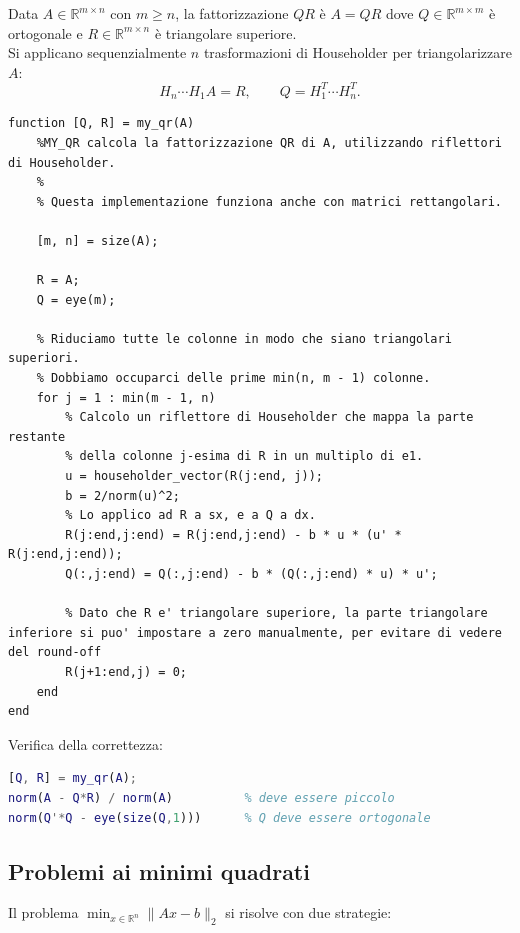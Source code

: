 \documentclass[12pt,a4paper,]{report}
\begin{document}
Data $A \in \mathbb{R}^{m \times n}$ con $m \geq n$, la fattorizzazione $QR$ è
$A = QR$ dove $Q \in \mathbb{R}^{m \times m}$ è ortogonale e $R \in \mathbb{R}^{m \times n}$
è triangolare superiore.\\
Si applicano sequenzialmente $n$ trasformazioni di Householder per triangolarizzare $A$:
\[
  H_n \cdots H_1 A = R, \qquad Q = H_1^T \cdots H_n^T.
\]
\begin{lstlisting}
function [Q, R] = my_qr(A)
    %MY_QR calcola la fattorizzazione QR di A, utilizzando riflettori di Householder.
    %
    % Questa implementazione funziona anche con matrici rettangolari. 
    
    [m, n] = size(A);
    
    R = A;
    Q = eye(m);
    
    % Riduciamo tutte le colonne in modo che siano triangolari superiori.
    % Dobbiamo occuparci delle prime min(n, m - 1) colonne. 
    for j = 1 : min(m - 1, n)
        % Calcolo un riflettore di Householder che mappa la parte restante
        % della colonne j-esima di R in un multiplo di e1.
        u = householder_vector(R(j:end, j));
        b = 2/norm(u)^2;
        % Lo applico ad R a sx, e a Q a dx.
        R(j:end,j:end) = R(j:end,j:end) - b * u * (u' * R(j:end,j:end));
        Q(:,j:end) = Q(:,j:end) - b * (Q(:,j:end) * u) * u';
        
        % Dato che R e' triangolare superiore, la parte triangolare inferiore si puo' impostare a zero manualmente, per evitare di vedere del round-off
        R(j+1:end,j) = 0;
    end
end
\end{lstlisting}
Verifica della correttezza:
\begin{lstlisting}[language=Matlab]
[Q, R] = my_qr(A);
norm(A - Q*R) / norm(A)          % deve essere piccolo
norm(Q'*Q - eye(size(Q,1)))      % Q deve essere ortogonale
\end{lstlisting}

\subsection{Problemi ai minimi quadrati}

Il problema $\min_{x \in \mathbb{R}^n} \|Ax - b\|_2$ si risolve con due strategie:
\end{document}
